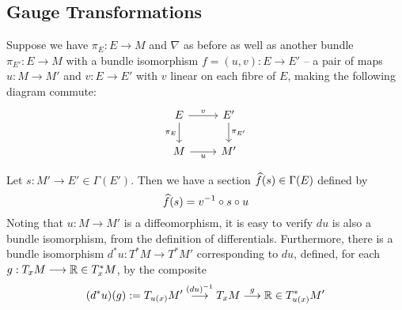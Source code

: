 
\subsection{Gauge Transformations}

Suppose we have $\pi_E : E \to M$ and $\nabla$ as before as well as another
bundle $\pi_{E'} : E \to M$ with a bundle isomorphism $f = (u, v) : E \to E'$ --
a pair of maps $u : M \to M'$ and $v : E \to E'$ with $v$ linear on each fibre
of $E$, making the following diagram commute:
\[\begin{tikzcd}
E \ar[d, "\pi_E" left] \ar[r, "v" above] & E' \ar[d, "\pi_{E'}" right]\\
M \ar[r, "u" below] & M'
\end{tikzcd}\]

Let $s : M' \to E' \in \Gamma(E')$. Then we have a section
$\wh{f}(s) \in \Gamma(E)$ defined by
\[
  \wh{f}(s) = v^{-1} \circ s \circ u
\]
Noting that $u : M \to M'$ is a diffeomorphism, it is easy to verify $du$
is also a bundle isomorphism, from the definition of differentials. Furthermore,
there is a bundle isomorphism $d^*u : T^*M \to T^*M'$ corresponding to $du$,
defined, for each $g : T_xM \to \R \in T^*_xM$, by the composite
\[
  (d^*u)(g) := T_{u(x)}M' \to[(du)^{-1}] T_xM \to[g] \R \in T^*_{u(x)}M'
\]

